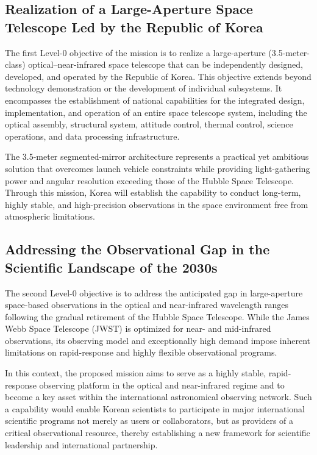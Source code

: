 \subsection{Realization of a Large-Aperture Space Telescope Led by the Republic of Korea}

The first Level-0 objective of the mission is to realize a large-aperture (3.5-meter-class) optical--near-infrared space telescope that can be independently designed, developed, and operated by the Republic of Korea. This objective extends beyond technology demonstration or the development of individual subsystems. It encompasses the establishment of national capabilities for the integrated design, implementation, and operation of an entire space telescope system, including the optical assembly, structural system, attitude control, thermal control, science operations, and data processing infrastructure.

The 3.5-meter segmented-mirror architecture represents a practical yet ambitious solution that overcomes launch vehicle constraints while providing light-gathering power and angular resolution exceeding those of the Hubble Space Telescope. Through this mission, Korea will establish the capability to conduct long-term, highly stable, and high-precision observations in the space environment free from atmospheric limitations.

\subsection{Addressing the Observational Gap in the Scientific Landscape of the 2030s}

The second Level-0 objective is to address the anticipated gap in large-aperture space-based observations in the optical and near-infrared wavelength ranges following the gradual retirement of the Hubble Space Telescope. While the James Webb Space Telescope (JWST) is optimized for near- and mid-infrared observations, its observing model and exceptionally high demand impose inherent limitations on rapid-response and highly flexible observational programs.

In this context, the proposed mission aims to serve as a highly stable, rapid-response observing platform in the optical and near-infrared regime and to become a key asset within the international astronomical observing network. Such a capability would enable Korean scientists to participate in major international scientific programs not merely as users or collaborators, but as providers of a critical observational resource, thereby establishing a new framework for scientific leadership and international partnership.

